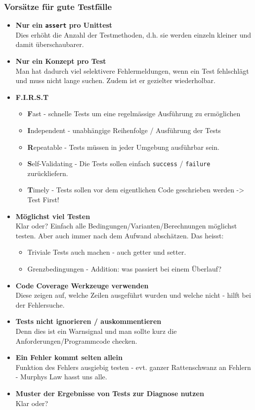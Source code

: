 \subsubsection{Vorsätze für gute Testfälle}
\begin{itemize}
  \item \textbf{Nur ein \texttt{assert} pro Unittest} \\
  Dies erhöht die Anzahl der Testmethoden, d.h. sie werden einzeln kleiner und damit überschaubarer. 
  \item \textbf{Nur ein Konzept pro Test} \\
  Man hat dadurch viel selektivere Fehlermeldungen, wenn ein Test fehlschlägt und muss nicht lange suchen. Zudem ist er gezielter wiederholbar.
  \item \textbf{F.I.R.S.T}
  \begin{itemize}
      \item \textbf{F}ast - schnelle Tests um eine regelmässige Ausführung zu ermöglichen
      \item \textbf{I}ndependent - unabhängige Reihenfolge / Ausführung der Tests
      \item \textbf{R}epeatable - Tests müssen in jeder Umgebung ausführbar sein.
      \item \textbf{S}elf-Validating - Die Tests sollen einfach \texttt{success} / \texttt{failure} zurückliefern.
      \item \textbf{T}imely - Tests sollen vor dem eigentlichen Code geschrieben werden -> Test First!
  \end{itemize}
  \item \textbf{Möglichst viel Testen} \\
  Klar oder? Einfach alle Bedingungen/Varianten/Berechnungen möglichst testen. Aber auch immer nach dem Aufwand abschätzen. Das heisst:
  \begin{itemize}
  \item Triviale Tests auch machen - auch getter und setter.
  \item Grenzbedingungen - Addition: was passiert bei einem Überlauf?

\end{itemize}

  \item \textbf{Code Coverage Werkzeuge verwenden} \\
  Diese zeigen auf, welche Zeilen ausgeführt wurden und welche nicht - hilft bei der Fehlersuche.
  \item \textbf{Tests nicht ignorieren / auskommentieren} \\
  Denn dies ist ein Warnsignal und man sollte kurz die Anforderungen/Programmcode checken.
  \item \textbf{Ein Fehler kommt selten allein} \\
  Funktion des Fehlers ausgiebig testen - evt. ganzer Rattenschwanz an Fehlern - Murphys Law hasst uns alle.
  \item \textbf{Muster der Ergebnisse von Tests zur Diagnose nutzen} \\
  Klar oder?
\end{itemize}

